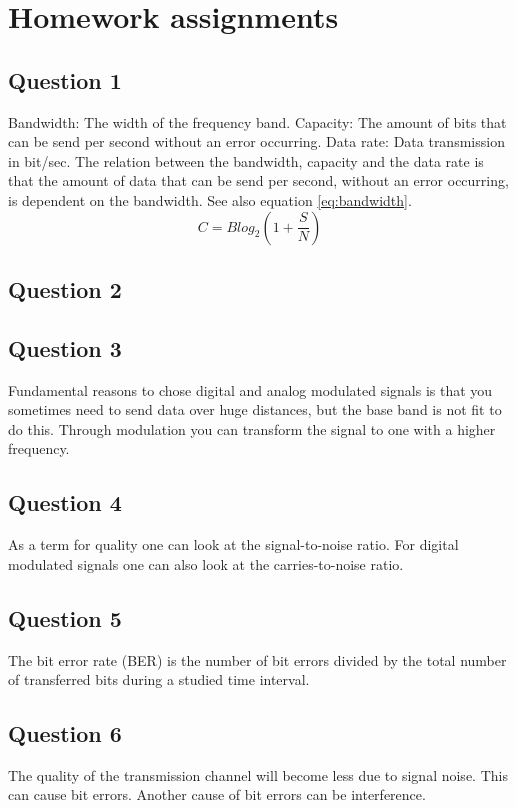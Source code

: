 \documentclass[final]{scrreprt} %
\begin{document}
\section{Homework assignments}
\label{sec:homework1}
\subsection{Question 1}
Bandwidth: The width of the frequency band.
Capacity: The amount of bits that can be send per second without an error occurring. 
Data rate: Data transmission in bit/sec.
The relation between the bandwidth, capacity and the data rate is that the amount of data that can be send per second, without an error occurring, is dependent on the bandwidth. See also equation \ref{eq:bandwidth}.
\begin{equation}
\label{eq:bandwidth}
C= B log_{2}(1+\frac{S}{N})
\end{equation}
\subsection{Question 2}

\subsection{Question 3}
Fundamental reasons to chose digital and analog modulated signals is that you sometimes need to send data over huge distances, but the base band is not fit to do this. Through modulation you can transform the signal to one with a higher frequency.
\subsection{Question 4}
As a term for quality one can look at the signal-to-noise ratio.
For digital modulated signals one can also look at the carries-to-noise ratio.
\subsection{Question 5}
The bit error rate (BER) is the number of bit errors divided by the total number of transferred bits during a studied time interval.
\subsection{Question 6}
The quality of the transmission channel will become less due to signal noise. This can cause bit errors. 
Another cause of bit errors can be interference.
\end{document}
